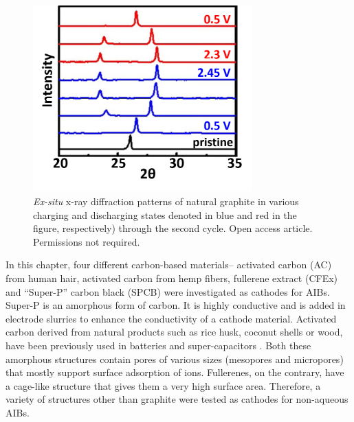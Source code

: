  \begin{figure}[h]
  \centering
  \includegraphics[width=0.75\textwidth]{Figures/chap5fig/ramanpap}
    \caption{\textit{Ex-situ} x-ray diffraction patterns of natural graphite in various charging and discharging states denoted in blue and red in the figure, respectively) through the second cycle. \cite{wang_advanced_2017} Open access article. Permissions not required.}
  \label{Figures/chap5fig:ramanpap}
\end{figure}



In this chapter, four different carbon-based materials-- activated carbon (AC) from human hair, activated carbon from hemp fibers, fullerene extract (CFEx) and \enquote{Super-P} carbon black (SPCB) were investigated as cathodes for AIBs. Super-P is an amorphous form of carbon. It is highly conductive and is added in electrode slurries to enhance the conductivity of a cathode material. Activated carbon derived from natural products such as rice husk, coconut shells or wood, have been previously used in batteries and super-capacitors \cite{hussain_development_2019, frackowiak_carbon_2001}. Both these amorphous structures contain pores of various sizes (mesopores and micropores) that mostly support surface adsorption of ions. Fullerenes, on the contrary, have a cage-like structure that gives them a very high surface area. Therefore, a variety of structures other than graphite were tested as cathodes for non-aqueous AIBs.    

